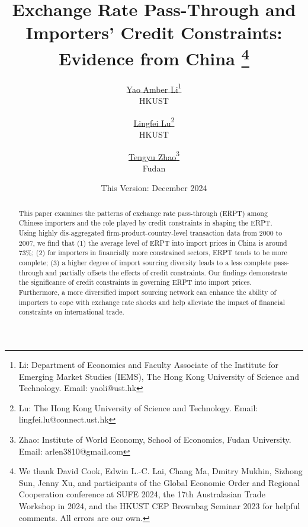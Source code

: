

\linespread{1.2}
\geometry{a4paper,scale=0.75}



\title{  \Large \textbf{Exchange Rate Pass-Through and Importers' Credit Constraints: Evidence from China} 
\thanks{We thank David Cook, Edwin L.-C. Lai, Chang Ma, Dmitry Mukhin, Sizhong Sun, Jenny Xu, and participants of the Global Economic Order and Regional Cooperation conference at SUFE 2024, the 17th Australasian Trade Workshop in 2024, and the HKUST CEP Brownbag Seminar 2023 for helpful comments. All errors are our own.}}

\author{\large \href{http://yaoli.people.ust.hk/}{Yao Amber Li}\footnote{Li: Department of Economics and Faculty Associate of the Institute for Emerging Market Studies (IEMS), The Hong Kong University of Science and Technology. Email: yaoli@ust.hk}\\ {HKUST}
\and \href{}{Lingfei Lu}\footnote{Lu: The Hong Kong University of Science and Technology. Email: lingfei.lu@connect.ust.hk} \\ {HKUST} 
\and \href{}{Tengyu Zhao}\footnote{Zhao: Institute of World Economy, School of Economics, Fudan University. Email: arlen3810@gmail.com} \\ {Fudan} }

\date{This Version: December 2024}

\maketitle

\begin{abstract}
This paper examines the patterns of exchange rate pass-through (ERPT) among Chinese importers and the role played by credit constraints in shaping the ERPT. Using highly dis-aggregated firm-product-country-level transaction data from 2000 to 2007, we find that (1) the average level of ERPT into import prices in China is around 73\%; (2) for importers in financially more constrained sectors, ERPT tends to be more complete; (3) a higher degree of import sourcing diversity leads to a less complete pass-through and partially offsets the effects of credit constraints. Our findings demonstrate the significance of credit constraints in governing ERPT into import prices. Furthermore, a more diversified import sourcing network can enhance the ability of importers to cope with exchange rate shocks and help alleviate the impact of financial constraints on international trade.

\end{abstract}

